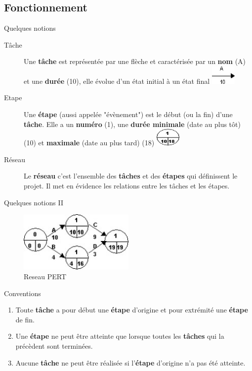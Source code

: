 \documentclass{beamer}
\begin{document}
\subsection{Fonctionnement}

\begin{frame}{Quelques notions}
\begin{description}
    \item[Tâche] Une \textbf{tâche} est représentée par une flèche et caractérisée par un \textbf{nom} (A) et une \textbf{durée} (10), elle évolue d'un état initial à un état final \includegraphics[width=0.1\textwidth]{tache}
    \item[Etape] Une \textbf{étape} (aussi appelée "évènement") est le début (ou la fin) d'une \textbf{tâche}. Elle a un \textbf{numéro} (1), une \textbf{durée minimale} (date au plus tôt) (10) et \textbf{maximale} (date au plus tard) (18) \includegraphics[width=0.1\textwidth]{etape}
    \item[Réseau] Le \textbf{réseau} c'est l'ensemble des \textbf{tâches} et des \textbf{étapes} qui définissent le projet. Il met en évidence les relations entre les tâches et les étapes. 
\end{description}
\end{frame}

\begin{frame}{Quelques notions II}
\begin{figure}
      \centering
      \includegraphics[width=0.5\textwidth]{reseau}
      \caption{Reseau PERT}
\end{figure}
\end{frame}

\begin{frame}{Conventions}
\begin{enumerate}
    \item Toute \textbf{tâche} a pour début une \textbf{étape} d’origine et pour extrémité une \textbf{étape} de fin.
    \item Une \textbf{étape} ne peut être atteinte que lorsque toutes les \textbf{tâches} qui la précèdent sont terminées.
    \item Aucune \textbf{tâche} ne peut être réalisée si l’\textbf{étape} d’origine n’a pas été atteinte.
\end{enumerate}
\end{frame}
\end{document}
